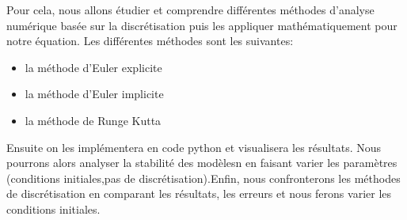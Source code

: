 Pour cela, nous allons étudier et comprendre différentes méthodes d'analyse numérique basée sur la discrétisation puis les appliquer mathématiquement pour notre équation.
\newline
Les différentes méthodes sont les suivantes:
\begin{itemize}
    \item la méthode d'Euler explicite
    \item la méthode d'Euler implicite
    \item la méthode de Runge Kutta
\end{itemize}
Ensuite on les implémentera en code python et visualisera les résultats. Nous pourrons alors analyser la stabilité des modèlesn en faisant varier les paramètres (conditions initiales,pas de discrétisation).Enfin, nous confronterons les méthodes de discrétisation en comparant les résultats, les erreurs et nous ferons varier les conditions initiales.\\



